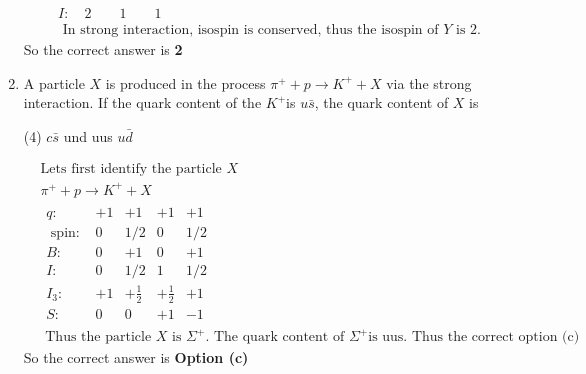\begin{enumerate}
\begin{answer}
\begin{align*}
		 &I: \quad 2 \qquad 1 \qquad 1\\
		 &\text { In strong interaction, isospin is conserved, thus the isospin of } Y \text { is } 2 .
		\end{align*}
		So the correct answer is \textbf{2}
	\end{answer}
	\item  A particle $X$ is produced in the process $\pi^{+}+p \rightarrow K^{+}+X$ via the strong interaction. If the quark content of the $K^{+}$is $u \bar{s}$, the quark content of $X$ is
{}
	 \begin{tasks}(4)
		\task[\textbf{a.}]$c \bar{s}$
		\task[\textbf{b.}]und
		\task[\textbf{c.}]uus
		\task[\textbf{d.}]$u \bar{d}$ 
	\end{tasks}
\begin{answer}
	\begin{align*}
	&\text{Lets first identify the particle $X$}\\
	&\pi^{+}+p \rightarrow K^{+}+X\\
	&\begin{array}{lllll}
	q:& +1&+1&+1&+1\\
	\text { spin: } & 0 & 1 / 2 & 0 & 1 / 2\\
	B:&  0&+1&  0&+1\\
	I: &0 &1 / 2& 1 & 1 / 2\\
	I_3: &+1&+\frac{1}{2}&+\frac{1}{2}&+1\\
	S:&  0 & 0 &+1&-1
	\end{array}\\
	&\text { Thus the particle } X \text { is } \Sigma^{+} \text {. The quark content of } \Sigma^{+} \text {is uus. Thus the correct option (c) }
	\end{align*}
	So the correct answer is \textbf{Option (c)}
\end{answer}
\end{enumerate}
